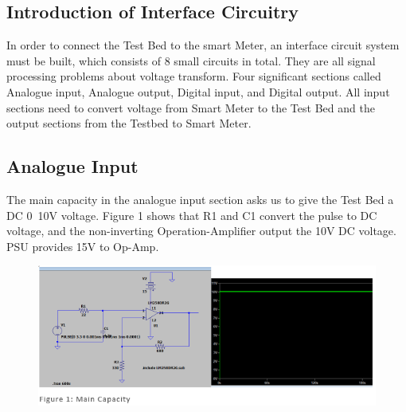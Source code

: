 \documentclass[9pt, technote, a4paper, nofonttune]{IEEEphot}
\begin{document}
        \subsection{Introduction of Interface Circuitry}
        \hspace{0.5cm} In order to connect the Test Bed to the smart Meter, an interface 
        circuit system must be built, which consists of 8 small circuits in total. They are 
        all signal processing problems about voltage transform. Four significant sections 
        called Analogue input, Analogue output, Digital input, and Digital output. All input 
        sections need to convert voltage from Smart Meter to the Test Bed and the output 
        sections from the Testbed to Smart Meter.
        
        \subsection{Analogue Input}
        \hspace{0.5cm} The main capacity in the analogue input section asks us to give the 
        Test Bed a DC 0~10V voltage. Figure 1 shows that R1 and C1 convert the pulse to DC 
        voltage, and the non-inverting Operation-Amplifier output the 10V DC voltage. PSU 
        provides 15V to Op-Amp.
        \begin{figure}[h]
        \centering
        \includegraphics[width=30pc]{D5/3.3v (main capacity).png}
        \label{fig_env1}
        \end{figure}
        
\end{document}
